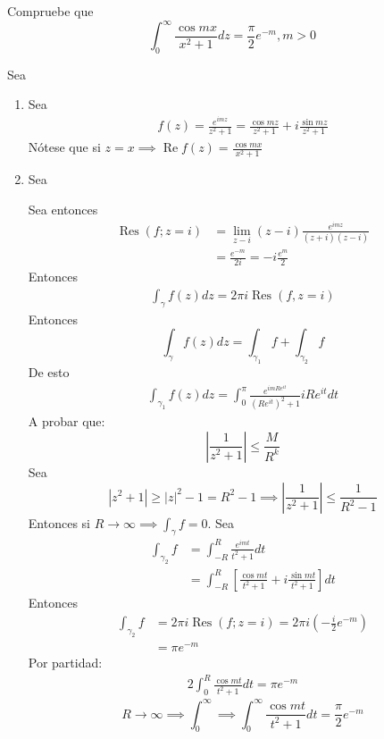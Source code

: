 \begin{ejemplo}
    Compruebe que $$\int_0^\infty \frac{\cos mx}{x^2+1}dz =\frac{\pi}{2}e^{-m},m>0$$
    \begin{sol}
        Sea
        \begin{enumerate}
            \item Sea 
                \begin{align*}
                    f(z)=\frac{e^{imz}}{z^2+1} =\frac{\cos mz}{z^2+1}+i\frac{\sin mz}{z^2+1}
                \end{align*}
                Nótese que si $z=x\implies \operatorname{Re}f(z)=\frac{\cos mx}{x^2+1}$
            \item Sea 
            
            Sea entonces
            \begin{align*}
                \operatorname{Res}(f;z=i)&=\lim_{z-i}(z-i)\frac{e^{imz}}{(z+i)(z-i)}\\
                &= \frac{e^{-m}}{2i} = -i\frac{e^{m}}{2}
            \end{align*}
            Entonces 
            \begin{align*}
                \int_\gamma f(z)dz = 2\pi i \operatorname{Res}(f,z=i)
            \end{align*}
            Entonces
            $$\int_\gamma f(z)dz=\int_{\gamma_1}f+\int_{\gamma_2}f$$
            De esto 
            \begin{align*}
                \int_{\gamma_1}f(z)dz =\int_{0}^\pi \frac{e^{imRe^{it}}}{(Re^{it})^2+1}iRe^{it}dt
            \end{align*}
            A probar que: 
            $$\left|\frac{1}{z^2+1}\right|\leq \frac{M}{R^k}$$
            Sea 
            $$|z^2+1|\geq |z|^2-1 = R^2-1\implies \left|\frac{1}{z^2+1}\right|\leq \frac{1}{R^2-1}$$
            Entonces si $R\to \infty\implies \int_\gamma f = 0$.
            Sea 
            \begin{align*}
                \int_{\gamma_2}f &=\int_{-R}^R \frac{e^{imt}}{t^2+1}dt\\
                &= \int_{-R}^R \left[\frac{\cos mt}{t^2+1}+i\frac{\sin mt}{t^2+1}\right]dt
            \end{align*}
            Entonces
            \begin{align*}
                \int_{\gamma_2}f &= 2 \pi  i\operatorname{Res}(f;z=i)=2\pi i\left(-\frac{i}{2}e^{-m}\right)\\
                &= \pi e^{-m}
            \end{align*}
            Por partidad: 
            \begin{align*}
                2\int_0^R \frac{\cos mt}{t^2+1}dt = \pi e^{-m}
            \end{align*}
            $$R\to \infty\implies \int_0^\infty \implies \int_0^\infty \frac{\cos mt}{t^2+1}dt =\frac{\pi}{2}e^{-m}$$
        \end{enumerate}
    \end{sol}
\end{ejemplo}